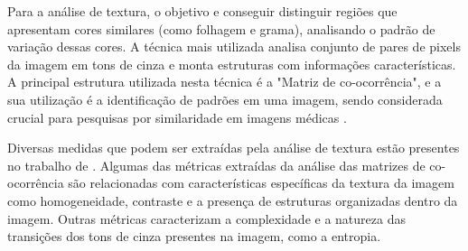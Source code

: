Para a análise de textura, o objetivo e conseguir distinguir regiões que apresentam cores similares (como folhagem e grama), analisando o padrão
de variação dessas cores. A técnica mais utilizada analisa conjunto de pares de pixels da imagem em tons de cinza e monta estruturas com informações características.
A principal estrutura utilizada nesta técnica é a "Matriz de co-ocorrência", e a sua utilização é a identificação de padrões
em uma imagem, sendo considerada crucial para pesquisas por similaridade em imagens médicas \cite{Glatard2004}.\par
												
Diversas medidas que podem ser extraídas pela análise de textura estão presentes no trabalho de \cite{Haralick1973}. Algumas das métricas extraídas
da análise das matrizes de co-ocorrência são  relacionadas com características específicas da textura da imagem como homogeneidade, contraste
e a presença de estruturas organizadas dentro da imagem. Outras métricas caracterizam a complexidade e a natureza das transições dos tons de cinza presentes
na imagem, como a entropia.\par



